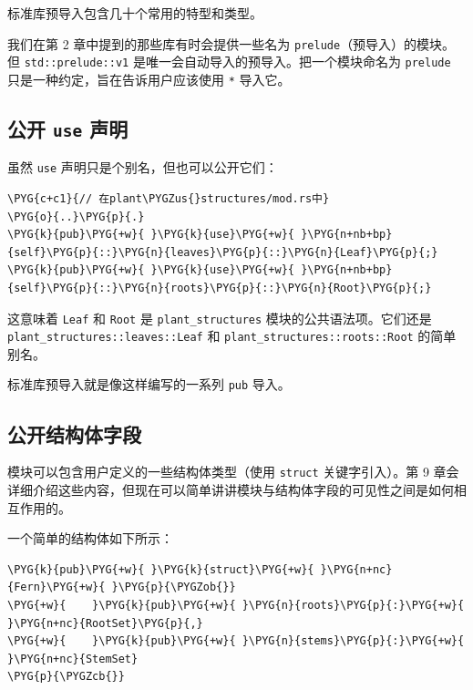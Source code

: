 标准库预导入包含几十个常用的特型和类型。

我们在第 2 章中提到的那些库有时会提供一些名为 \texttt{prelude}（预导入）的模块。但 \texttt{std::prelude::v1} 是唯一会自动导入的预导入。把一个模块命名为 \texttt{prelude} 只是一种约定，旨在告诉用户应该使用 \texttt{*} 导入它。

\subsection{公开 \texttt{use} 声明}

虽然 \texttt{use} 声明只是个别名，但也可以公开它们：

\begin{Verbatim}[commandchars=\\\{\},breaklines=true,breakanywhere=true,fontsize=\codefont,xleftmargin=17bp]
\PYG{c+c1}{// 在plant\PYGZus{}structures/mod.rs中}
\PYG{o}{..}\PYG{p}{.}
\PYG{k}{pub}\PYG{+w}{ }\PYG{k}{use}\PYG{+w}{ }\PYG{n+nb+bp}{self}\PYG{p}{::}\PYG{n}{leaves}\PYG{p}{::}\PYG{n}{Leaf}\PYG{p}{;}
\PYG{k}{pub}\PYG{+w}{ }\PYG{k}{use}\PYG{+w}{ }\PYG{n+nb+bp}{self}\PYG{p}{::}\PYG{n}{roots}\PYG{p}{::}\PYG{n}{Root}\PYG{p}{;}
\end{Verbatim}

这意味着 \texttt{Leaf} 和 \texttt{Root} 是 \texttt{plant\_structures} 模块的公共语法项。它们还是 \texttt{plant\_structures::leaves::Leaf} 和 \texttt{plant\_structures::roots::Root} 的简单别名。

标准库预导入就是像这样编写的一系列 \texttt{pub} 导入。

\subsection{公开结构体字段}

模块可以包含用户定义的一些结构体类型（使用 \texttt{struct} 关键字引入）。第 9 章会详细介绍这些内容，但现在可以简单讲讲模块与结构体字段的可见性之间是如何相互作用的。

一个简单的结构体如下所示：

\begin{Verbatim}[commandchars=\\\{\},breaklines=true,breakanywhere=true,fontsize=\codefont,xleftmargin=17bp]
\PYG{k}{pub}\PYG{+w}{ }\PYG{k}{struct}\PYG{+w}{ }\PYG{n+nc}{Fern}\PYG{+w}{ }\PYG{p}{\PYGZob{}}
\PYG{+w}{    }\PYG{k}{pub}\PYG{+w}{ }\PYG{n}{roots}\PYG{p}{:}\PYG{+w}{ }\PYG{n+nc}{RootSet}\PYG{p}{,}
\PYG{+w}{    }\PYG{k}{pub}\PYG{+w}{ }\PYG{n}{stems}\PYG{p}{:}\PYG{+w}{ }\PYG{n+nc}{StemSet}
\PYG{p}{\PYGZcb{}}
\end{Verbatim}

